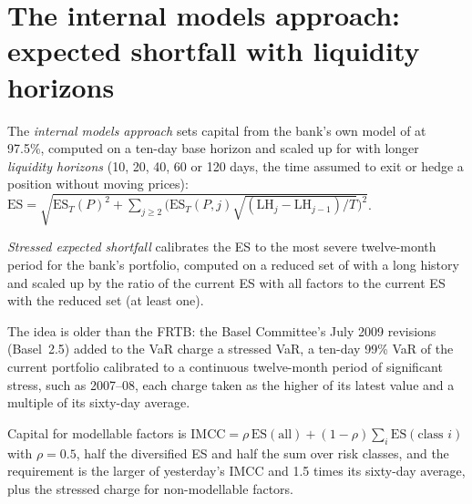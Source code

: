 \section{The internal models approach: expected shortfall with liquidity horizons}

\begin{definition}\label{def:rc:regulatory-capital-for-trading-books:ima}
The \emph{internal models approach} sets capital from the
bank's own model of  at 97.5\%, computed on a ten-day base horizon and scaled
up for  with longer \emph{liquidity horizons} (10, 20, 40,
60 or 120 days, the time assumed to exit or hedge a position without moving prices):
$\mathrm{ES} = \sqrt{\mathrm{ES}_T(P)^2+\sum_{j\ge2}\bigl(\mathrm{ES}_T(P,j)\sqrt{(\mathrm{LH}_j-\mathrm{LH}_{j-1})/T}\bigr)^2}$.
\end{definition}

\begin{definition}\label{def:rc:regulatory-capital-for-trading-books:ses}
\emph{Stressed expected shortfall} calibrates the ES to the
most severe twelve-month period for the bank's portfolio, computed on a reduced set of  with a long history and scaled up by the ratio of the current ES with all factors to
the current ES with the reduced set (at least one).
\end{definition}

The idea is older than the FRTB: the Basel Committee's July 2009 revisions (Basel~2.5) added to the VaR
charge a stressed VaR, a ten-day 99\% VaR of the current portfolio calibrated to a continuous twelve-month
period of significant stress, such as 2007--08, each charge taken as the higher of its latest value and a
multiple of its sixty-day average.

Capital for modellable factors is $\mathrm{IMCC} = \rho\,\mathrm{ES}(\text{all})+(1-\rho)\sum_i\mathrm{ES}(\text{class }i)$ with $\rho = 0.5$,
half the diversified ES and half the sum over risk classes, and the requirement is the larger of
yesterday's IMCC and 1.5 times its sixty-day average, plus the stressed charge for
non-modellable factors.

